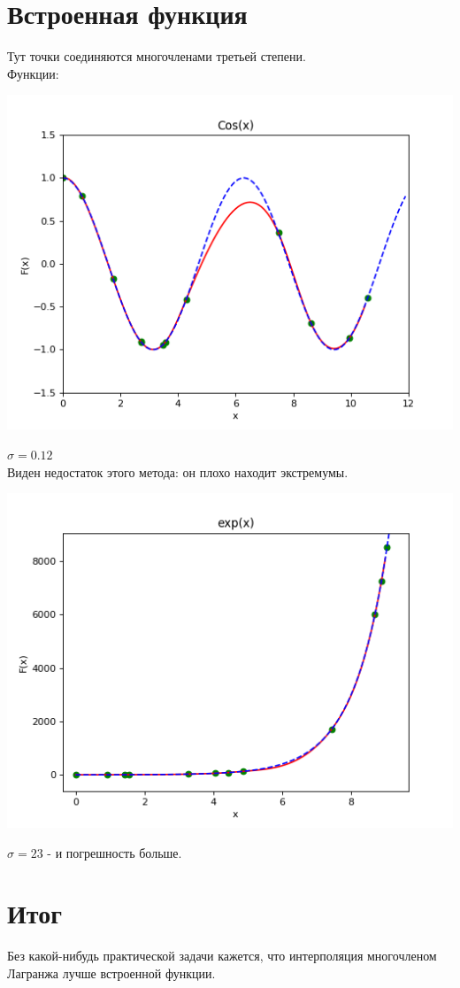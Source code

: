 \documentclass[12pt,a4paper]{scrartcl}
\begin{document}
	\section{Встроенная функция}
	
	Тут точки соединяются многочленами третьей степени. \\
	Функции: \\
		\begin{center}
			\includegraphics[scale=0.8]{figure_5} \\
		\end{center}
		$\sigma = 0.12$ \\
		Виден недостаток этого метода: он плохо находит экстремумы. \\
		\begin{center}
			\includegraphics[scale=0.8]{figure_6} \\
		\end{center}
		$\sigma = 23$ - и погрешность больше. \\
		
		\section{Итог}
			Без какой-нибудь практической задачи кажется, что интерполяция многочленом Лагранжа лучше встроенной функции.
\end{document}
